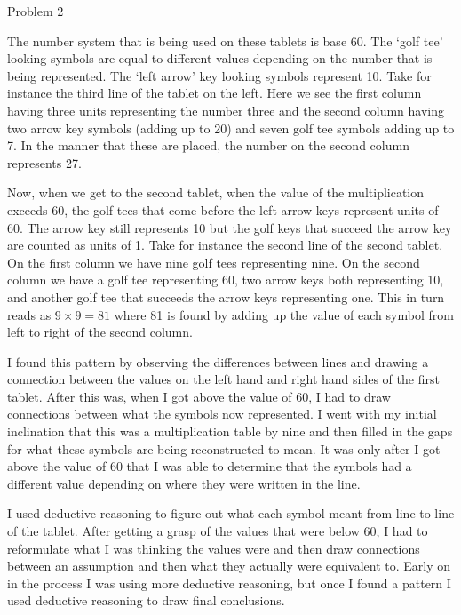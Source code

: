 \begin{problem}{Problem 2}
\begin{highlight}[Solution]
        The number system that is being used on these tablets is base 60. The `golf tee' looking symbols are equal to different values depending on the number that is being represented. The `left arrow'
        key looking symbols represent 10. Take for instance the third line of the tablet on the left. Here we see the first column having three units representing the number three and the second column
        having two arrow key symbols (adding up to 20) and seven golf tee symbols adding up to 7. In the manner that these are placed, the number on the second column represents 27.

        Now, when we get to the second tablet, when the value of the multiplication exceeds 60, the golf tees that come before the left arrow keys represent units of 60. The arrow key still represents 10
        but the golf keys that succeed the arrow key are counted as units of 1. Take for instance the second line of the second tablet. On the first column we have nine golf tees representing nine. On the
        second column we have a golf tee representing 60, two arrow keys both representing 10, and another golf tee that succeeds the arrow keys representing one. This in turn reads as $9 \times 9 = 81$ where
        81 is found by adding up the value of each symbol from left to right of the second column.

        I found this pattern by observing the differences between lines and drawing a connection between the values on the left hand and right hand sides of the first tablet. After this was, when I got above
        the value of 60, I had to draw connections between what the symbols now represented. I went with my initial inclination that this was a multiplication table by nine and then filled in the gaps for
        what these symbols are being reconstructed to mean. It was only after I got above the value of 60 that I was able to determine that the symbols had a different value depending on where they were written
        in the line.

        I used deductive reasoning to figure out what each symbol meant from line to line of the tablet. After getting a grasp of the values that were below 60, I had to reformulate what I was thinking the values
        were and then draw connections between an assumption and then what they actually were equivalent to. Early on in the process I was using more deductive reasoning, but once I found a pattern I used deductive
        reasoning to draw final conclusions.
    \end{highlight}
\end{problem}

